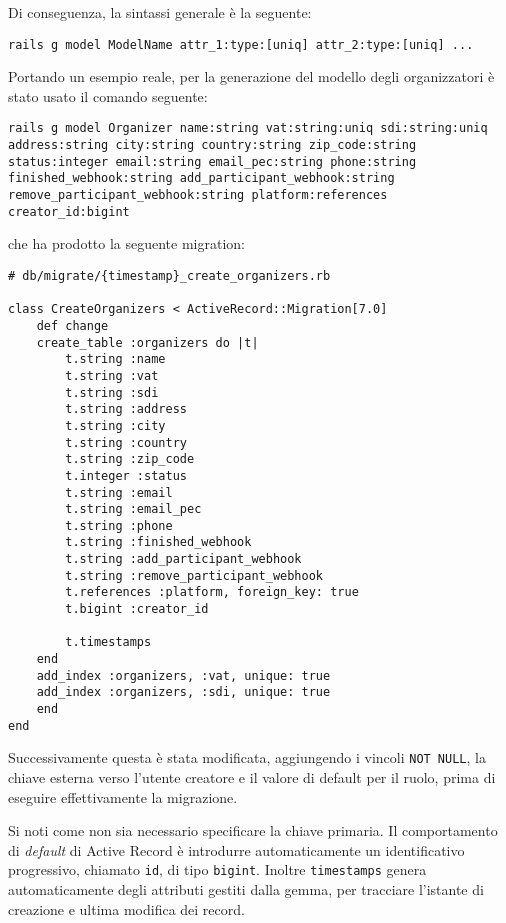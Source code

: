 Di conseguenza, la sintassi generale è la seguente:
\begin{verbatim}
rails g model ModelName attr_1:type:[uniq] attr_2:type:[uniq] ...
\end{verbatim}
Portando un esempio reale, per la generazione del modello degli organizzatori è stato usato il comando seguente:
\begin{verbatim}
rails g model Organizer name:string vat:string:uniq sdi:string:uniq address:string city:string country:string zip_code:string status:integer email:string email_pec:string phone:string finished_webhook:string add_participant_webhook:string remove_participant_webhook:string platform:references creator_id:bigint
\end{verbatim}
che ha prodotto la seguente migration:
\begin{verbatim}
# db/migrate/{timestamp}_create_organizers.rb

class CreateOrganizers < ActiveRecord::Migration[7.0]
	def change
	create_table :organizers do |t|
		t.string :name
		t.string :vat
		t.string :sdi
		t.string :address
		t.string :city
		t.string :country
		t.string :zip_code
		t.integer :status
		t.string :email
		t.string :email_pec
		t.string :phone
		t.string :finished_webhook
		t.string :add_participant_webhook
		t.string :remove_participant_webhook
		t.references :platform, foreign_key: true
		t.bigint :creator_id

		t.timestamps
	end
	add_index :organizers, :vat, unique: true
	add_index :organizers, :sdi, unique: true
	end
end
\end{verbatim}
Successivamente questa è stata modificata, aggiungendo i vincoli \verb|NOT NULL|, la chiave esterna verso l'utente creatore e il valore di default per il ruolo, prima di eseguire effettivamente la migrazione.

Si noti come non sia necessario specificare la chiave primaria. Il comportamento di \emph{default} di Active Record è introdurre automaticamente un identificativo progressivo, chiamato \verb|id|, di tipo \verb|bigint|. Inoltre \verb|timestamps| genera automaticamente degli attributi gestiti dalla gemma, per tracciare l'istante di creazione e ultima modifica dei record.

